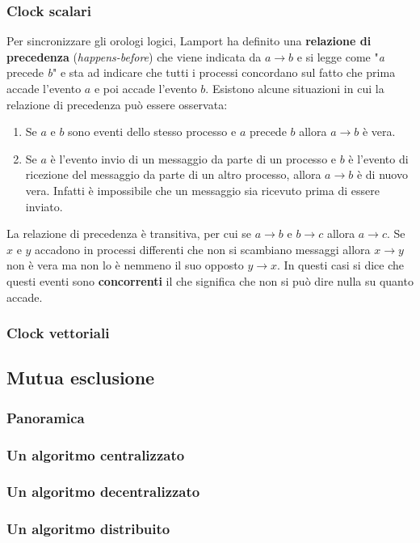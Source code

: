 \subsubsection{Clock scalari}
Per sincronizzare gli orologi logici, Lamport ha definito una \textbf{relazione di precedenza} (\emph{happens-before}) che viene indicata da $a\rightarrow b$ e si legge come "\emph{a} precede \emph{b}" e sta ad indicare che tutti i processi concordano sul fatto che prima accade l'evento $a$ e poi accade l'evento $b$.
Esistono alcune situazioni in cui la relazione di precedenza può essere osservata:
\begin{enumerate}
\item Se $a$ e $b$ sono eventi dello stesso processo e $a$ precede $b$ allora $a \rightarrow b$ è vera.
\item Se $a$ è l'evento invio di un messaggio da parte di un processo e $b$ è l'evento di ricezione del messaggio da parte di un altro processo, allora $a \rightarrow b$ è di nuovo vera. Infatti è impossibile che un messaggio sia ricevuto prima di essere inviato.
\end{enumerate}
La relazione di precedenza è transitiva, per cui se $a\rightarrow b$ e $b \rightarrow c$ allora $a \rightarrow c$. Se $x$ e $y$ accadono in processi differenti che non si scambiano messaggi allora $x \rightarrow y$ non è vera ma non lo è nemmeno il suo opposto $y \rightarrow x$. In questi casi si dice che questi eventi sono \textbf{concorrenti} il che significa che non si può dire nulla su quanto accade.
\subsubsection{Clock vettoriali}
\subsection{Mutua esclusione}
\subsubsection{Panoramica}
\subsubsection{Un algoritmo centralizzato}
\subsubsection{Un algoritmo decentralizzato}
\subsubsection{Un algoritmo distribuito}
